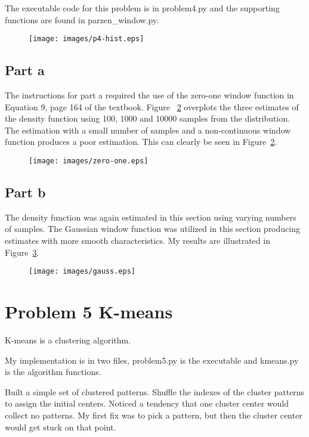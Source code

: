 \documentclass{report}
\begin{document}
The executable code for this problem is in problem4.py and the
supporting functions are found in parzen\_window.py.

\begin{figure}
\centering
  \texttt{[image: images/p4-hist.eps]}
  \label{fig:p4-hist}
\end{figure}

\subsection*{Part a}
The instructions for part a required the use of the zero-one window
function in Equation 9, page 164 of the textbook.  Figure
~\ref{fig:zero-one-parzen} overplots the three estimates of the
density function using 100, 1000 and 10000 samples from the
distribution.  The estimation with a small number of samples
and a non-continuous window function produces a poor estimation.
This can clearly be seen in Figure~\ref{fig:zero-one-parzen}.

\begin{figure}
\centering
  \texttt{[image: images/zero-one.eps]}
  \label{fig:zero-one-parzen}
\end{figure}

\subsection*{Part b}
The density function was again estimated in this section using varying
numbers of samples.  The Gaussian window function was utilized in this
section producing estimates with more smooth characteristics.  My
results are illustrated in Figure~\ref{fig:gauss-parzen}.
\begin{figure}
\centering
  \texttt{[image: images/gauss.eps]}
  \label{fig:gauss-parzen}
\end{figure}

\section*{Problem 5 K-means}
K-means is a clustering algorithm.

My implementation is in two files, problem5.py is the executable and
kmeans.py is the algorithm functions.

Built a simple set of clustered patterns.  Shuffle the indexes of the
cluster patterns to assign the initial centers.  Noticed a tendency
that one cluster center would collect no patterns.  My first fix was
to pick a pattern, but then the cluster center would get stuck on that point.
\end{document}
